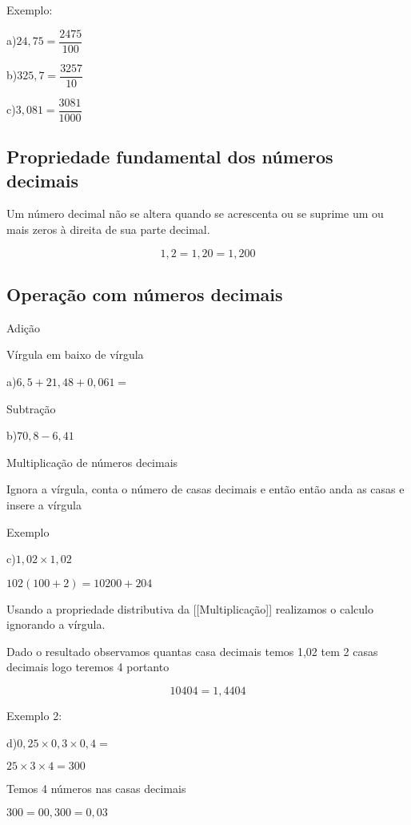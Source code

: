 \documentclass[letterpaper]{book}
\begin{document}
Exemplo:

\vspace{0.5em}

a)\(24,75 = \dfrac{2475}{100}\)

\vspace{0.5em}

b)\(325,7 = \dfrac{3257}{10}\)

\vspace{0.5em}

c)\(3,081 = \dfrac{3081}{1000}\)

\subsection{Propriedade fundamental dos números decimais}

Um número decimal não se altera quando se acrescenta ou se suprime um ou mais zeros à direita de sua parte decimal.

\[1,2 = 1,20 = 1,200\]


\subsection{Operação com números decimais}

Adição

Vírgula em baixo de vírgula

a)\(6,5 + 21,48 + 0,061 =\)

Subtração

b)\(70,8 - 6,41\)

Multiplicação de números decimais

Ignora a vírgula, conta o número de casas decimais e então então anda as casas e insere a vírgula

Exemplo

c)\(1,02\times1,02\)


\(102(100+2) = 10200 + 204\)

Usando a propriedade distributiva da [[Multiplicação]] realizamos o calculo ignorando a vírgula.

Dado o resultado observamos quantas casa decimais temos 1,02 tem 2 casas decimais logo teremos 4 portanto

\[10404 = 1,4404\]

Exemplo 2:

d)\(0,25 \times 0,3 \times 0,4 =\)

$25 \times 3 \times 4 = 300$ 

Temos 4 números nas casas decimais

$300 = 00,300 = 0,03$
\end{document}
